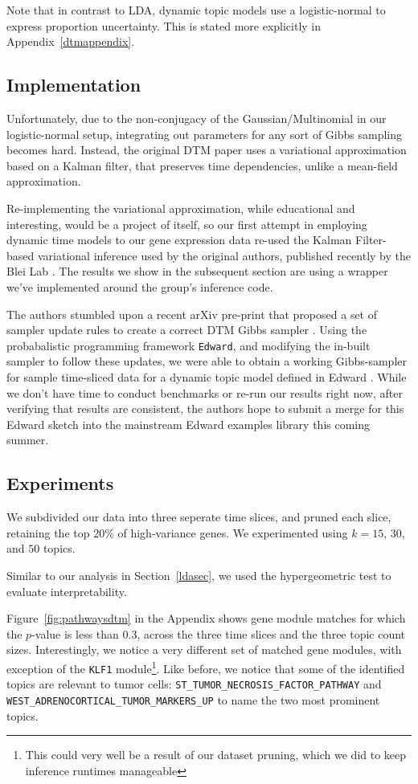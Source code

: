 \documentclass{article}
\begin{document}
Note that in contrast to LDA, dynamic topic models use a logistic-normal to express proportion uncertainty. This is stated more explicitly in Appendix~\ref{dtmappendix}.

\subsection{Implementation} 

Unfortunately, due to the non-conjugacy of the Gaussian/Multinomial in our logistic-normal setup, integrating out parameters for any sort of Gibbs sampling becomes hard. Instead, the original DTM paper uses a variational approximation based on a Kalman filter, that preserves time dependencies, unlike a mean-field approximation.

Re-implementing the variational approximation, while educational and interesting, would be a project of itself, so our first attempt in employing dynamic time models to our gene expression data re-used the Kalman Filter-based variational inference used by the original authors, published recently by the Blei Lab \cite{dtmbleigit}. The results we show in the subsequent section are using a wrapper we've implemented around the group's inference code.

The authors stumbled upon a recent arXiv pre-print that proposed a set of sampler update rules to create a correct DTM Gibbs sampler \cite{sdtm}. Using the probabalistic programming framework \texttt{Edward}, and modifying the in-built sampler to follow these updates, we were able to obtain a working Gibbs-sampler for sample time-sliced data for a dynamic topic model defined in Edward \cite{edward}. While we don't have time to conduct benchmarks or re-run our results right now, after verifying that results are consistent, the authors hope to submit a merge for this Edward sketch into the mainstream Edward examples library this coming summer.

\subsection{Experiments} 
We subdivided our data into three seperate time slices, and pruned each slice, retaining the top 20\% of high-variance genes. We experimented using $k=15$, $30$, and $50$ topics.

Similar to our analysis in Section~\ref{ldasec}, we used the hypergeometric test to evaluate interpretability. 

Figure~\ref{fig:pathwaysdtm} in the Appendix shows gene module matches for which the $p$-value is less than 0.3, across the three time slices and the three topic count sizes. Interestingly, we notice a very different set of matched gene modules, with exception of the \texttt{KLF1} module\footnote{This could very well be a result of our dataset pruning, which we did to keep inference runtimes manageable}. Like before, we notice that some of the identified topics are relevant to tumor cells:
\texttt{ST\_TUMOR\_NECROSIS\_FACTOR\_PATHWAY} and \texttt{WEST\_ADRENOCORTICAL\_TUMOR\_MARKERS\_UP} to name the two most prominent topics.
\end{document}
